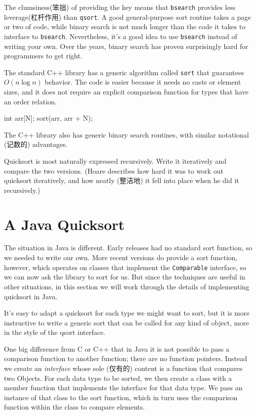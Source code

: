 The clumsiness(笨拙) of providing the key means that \verb'bsearch'
provides less leverage(杠杆作用) than \verb'qsort'. A good general-purpose
sort routine takes a page or two of code, while binary search is not much
longer than the code it takes to interface to \verb'bsearch'. Nevertheless,
it's a good idea to use \verb'bsearch' instead of writing your own. Over
the years, binary search has proven surprisingly hard for programmers to
get right.

The standard C++ library has a generic algorithm called \verb'sort' that
guarantees $O(n\log n)$ behavior. The code is easier because it needs no
casts or element sizes, and it does not require an explicit comparison
function for types that have an order relation.
\begin{wellcode}
    int arr[N];
    sort(arr, arr + N);
\end{wellcode}
The C++ library also has generic binary search routines, with similar
notational (记数的) advantages.

\begin{exercise}
Quicksort is most naturally expressed recursively. Write it iteratively and
compare the two versions. (Hoare describes how hard it was to work out
quicksort iteratively, and how neatly (整洁地) it fell into place when he
did it recursively.)
\end{exercise}

\section{A Java Quicksort}
\label{sec:a_java_quicksort}

The situation in Java is different. Early releases had no standard sort
function, so we needed to write our own. More recent versions do provide a
sort function, however, which operates on classes that implement the
\verb'Comparable' interface, so we can now ask the library to sort for us.
But since the techniques are useful in other situations, in this section we
will work through the details of implementing quicksort in Java.

It's easy to adapt a quicksort for each type we might want to sort, but it
is more instructive to write a generic sort that can be called for any kind
of object, more in the style of the qsort interface.

One big difference from C or C++ that in Java it is not possible to pass a
comparison function to another function; there are no function pointers.
Instead we create an \textit{interface} whose sole (仅有的) content is a
function that compares two Objects. For each data type to be sorted, we
then create a class with a member function that implements the interface
for that data type. We pass an instance of that class to the sort function,
which in turn uses the comparison function within the class to compare
elements.

